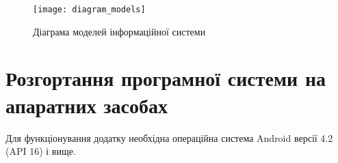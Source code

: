 \documentclass[../main.tex]{subfiles}
\begin{document}
\begin{figure}[H]
	\centering
	\texttt{[image: diagram\_models]}
	\caption{Діаграма моделей інформаційної системи}
	\label{diagram:3.3}
\end{figure}



\section{Розгортання програмної системи на апаратних засобах}

Для функціонування додатку необхідна операційна система Android версії 4.2 (API 16) і вище.



\end{document}
